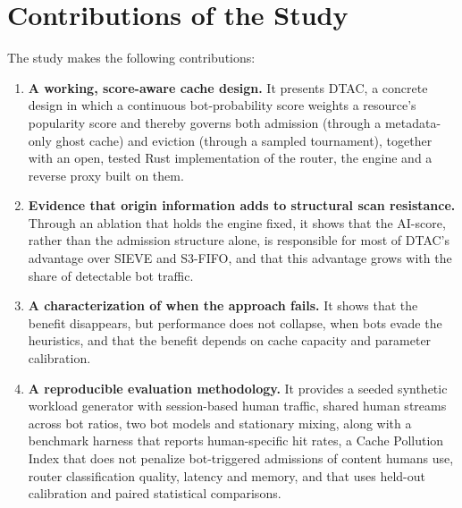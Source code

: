 \section{Contributions of the Study}
The study makes the following contributions:
\begin{enumerate}
    \item \textbf{A working, score-aware cache design.} It presents DTAC, a concrete design in which a continuous bot-probability score weights a resource's popularity score and thereby governs both admission (through a metadata-only ghost cache) and eviction (through a sampled tournament), together with an open, tested Rust implementation of the router, the engine and a reverse proxy built on them.
    \item \textbf{Evidence that origin information adds to structural scan resistance.} Through an ablation that holds the engine fixed, it shows that the AI-score, rather than the admission structure alone, is responsible for most of DTAC's advantage over SIEVE and S3-FIFO, and that this advantage grows with the share of detectable bot traffic.
    \item \textbf{A characterization of when the approach fails.} It shows that the benefit disappears, but performance does not collapse, when bots evade the heuristics, and that the benefit depends on cache capacity and parameter calibration.
    \item \textbf{A reproducible evaluation methodology.} It provides a seeded synthetic workload generator with session-based human traffic, shared human streams across bot ratios, two bot models and stationary mixing, along with a benchmark harness that reports human-specific hit rates, a Cache Pollution Index that does not penalize bot-triggered admissions of content humans use, router classification quality, latency and memory, and that uses held-out calibration and paired statistical comparisons.
\end{enumerate}


